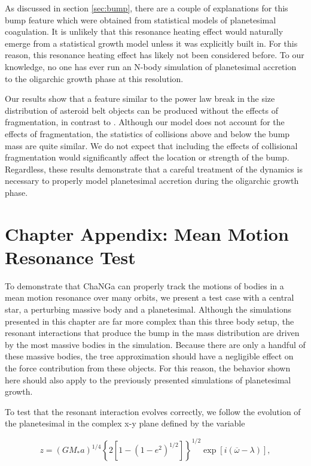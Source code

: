 As discussed in section \ref{sec:bump}, there are a couple of explanations for this bump feature which were obtained from 
statistical models of planetesimal coagulation. It is unlikely that this resonance heating effect would naturally emerge from a 
statistical growth model unless it was explicitly built in. For this reason, this resonance heating effect has likely not been 
considered before. To our knowledge, no one has ever run an N-body simulation of planetesimal accretion to the oligarchic 
growth phase at this resolution.

Our results show that a feature similar to the power law break in the size distribution of asteroid belt objects can be produced 
without the effects of fragmentation, in contrast to \cite{morbidelli09}. Although our model does not account for the effects of 
fragmentation, the statistics of collisions above and below the bump mass are quite similar. We do not expect that including the 
effects of collisional fragmentation would significantly affect the location or strength of the bump. Regardless, these results 
demonstrate that a careful treatment of the dynamics is necessary to properly model planetesimal accretion during the oligarchic 
growth phase.

\section{Chapter Appendix: Mean Motion Resonance Test}

To demonstrate that {\sc ChaNGa} can properly track the motions of bodies in a mean motion resonance over many orbits, we 
present a test case with a central star, a perturbing massive body and a planetesimal. Although the simulations presented in this 
chapter are far more complex than this three body setup, the resonant interactions that produce the bump in the mass distribution 
are driven by the most massive bodies in the simulation. Because there are only a handful of these massive bodies, the tree 
approximation should have a negligible effect on the force contribution from these objects. For this reason, the behavior shown 
here should also apply to the previously presented simulations of planetesimal growth.

To test that the resonant interaction evolves correctly, we follow the evolution of the planetesimal in the complex x-y plane 
defined by the variable \cite{duncan89}

\begin{equation}\label{eq:complex}
    z = \left(G M_{*} a\right)^{1 / 4}\left\{2\left[1-\left(1-e^{2}\right)^{1 / 2}\right]\right\}^{1 / 2} \exp \left[i(\overline{\omega}-\lambda)\right],
\end{equation}

